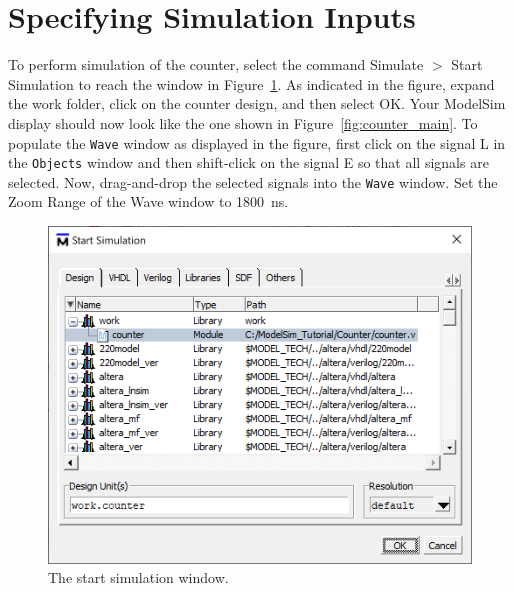 \documentclass[11pt, twoside, pdftex]{article}
\begin{document}
\section{Specifying Simulation Inputs}

To perform simulation of the counter, select the command {\sf Simulate $>$ Start Simulation} to reach
the window in Figure~\ref{fig:counter_start_sim}. As indicated in the figure, expand the {\sf work} 
folder, click on the {\sf counter} design, and then select {\sf OK}. Your ModelSim display should
now look like the one shown in Figure~\ref{fig:counter_main}. To populate the 
\texttt{Wave} window as displayed in the figure, first click on the signal {\sf L} in the 
\texttt{Objects} window and then shift-click on the signal {\sf E} so that all signals are selected.
Now, drag-and-drop the selected signals into the \texttt{Wave} window. Set the {\sf Zoom Range} of the Wave
window to 1800~ns.

\begin{figure}[H]
   \begin{center}
      \includegraphics[scale=0.70]{figures/counter_start_sim.png}
   \caption{The start simulation window.} 
	 \label{fig:counter_start_sim}
	 \end{center}
\end{figure}
\end{document}
